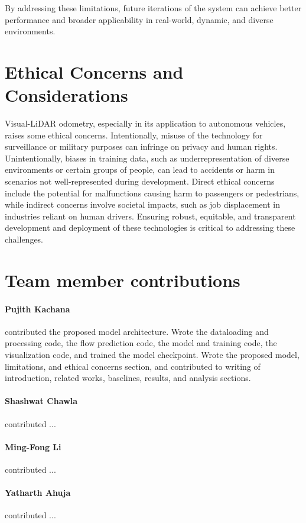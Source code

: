 \documentclass[11pt,a4paper]{article}
\begin{document}
By addressing these limitations, future iterations of the system can achieve better performance and broader applicability in real-world, dynamic, and diverse environments.

\clearpage
\section{Ethical Concerns and Considerations}
Visual-LiDAR odometry, especially in its application to autonomous vehicles, raises some ethical concerns. Intentionally, misuse of the technology for surveillance or military purposes can infringe on privacy and human rights. Unintentionally, biases in training data, such as underrepresentation of diverse environments or certain groups of people, can lead to accidents or harm in scenarios not well-represented during development. Direct ethical concerns include the potential for malfunctions causing harm to passengers or pedestrians, while indirect concerns involve societal impacts, such as job displacement in industries reliant on human drivers. Ensuring robust, equitable, and transparent development and deployment of these technologies is critical to addressing these challenges.

\clearpage
\section{Team member contributions}
\paragraph{Pujith Kachana} contributed the proposed model architecture. Wrote the dataloading and processing code, the flow prediction code, the model and training code, the visualization code, and trained the model checkpoint. Wrote the proposed model, limitations, and ethical concerns section, and contributed to writing of introduction, related works, baselines, results, and analysis sections.

\paragraph{Shashwat Chawla} contributed ...

\paragraph{Ming-Fong Li} contributed ...

\paragraph{Yatharth Ahuja} contributed ...




\end{document}
